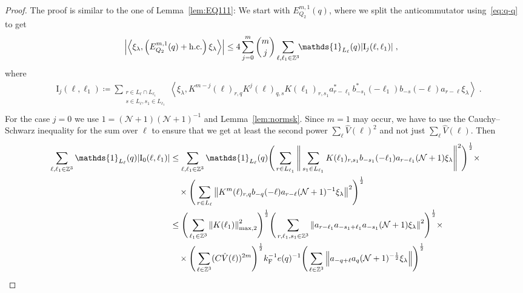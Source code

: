 \documentclass[12pt,a4paper]{article}
\numberwithin{equation}{section}
\newcommand{\1}{\mathbb{I}}
\newcommand{\F}{\mathrm{F}}
\newcommand{\I}{\mathrm{I}}
\newcommand{\kF}{k_\F}
\newcommand{\Zstar}{\mathbb{Z}^3} %
\newcommand{\Z}{\mathbb{Z}}
\newcommand{\NN}{\mathcal{N}}
\newcommand{\half}{\frac{1}{2}}
\newcommand{\eva}[1]{\left\langle #1 \right\rangle}
\theoremstyle{plain}
\theoremstyle{definition}
\theoremstyle{remark}
\theoremstyle{plain}
\theoremstyle{definition}
\theoremstyle{remark}
\begin{document}
\begin{proof}
The proof is similar to the one of Lemma~\ref{lem:EQ111}: We start with $ E^{m,1}_{Q_2}(q) $, where we split the anticommutator using~\eqref{eq:q-q} to get
\begin{equation} \label{eq:EQ2111}
\begin{aligned}
	& \abs{\eva{\xi_\lambda,\left(E^{m,1}_{Q_2}(q) + \mathrm{h.c.}\right) \xi_\lambda }}
	\le 4 \sum_{j=0}^m {{m}\choose j} \sum_{\ell,\ell_1 \in \Zstar}\!\! \mathds{1}_{L_\ell}(q) |\I_j(\ell, \ell_1)| \;,
	\end{aligned}
\end{equation}
where
\begin{equation}
\begin{aligned}
	& \I_j(\ell, \ell_1)
	\coloneq \sum_{\substack{r\in L_{\ell} \cap L_{\ell_1}\\ s \in L_{\ell},s_1\in L_{\ell_1}}}
		\eva{\xi_\lambda, K^{m-j}(\ell)_{r,q} K^{j}(\ell)_{q,s} K(\ell_1)_{r,s_1} a^*_{r-\ell_1} b^*_{-s_1}(-\ell_1) b_{-s}(-\ell) a_{r-\ell} \xi_\lambda} \;. \\
\end{aligned}
\end{equation}
For the case $ j = 0 $ we use $1 = (\NN+1) (\NN+1)^{-1}$ and Lemma~\ref{lem:normsk}. Since $ m = 1 $ may occur, we have to use the Cauchy--Schwarz inequality for the sum over $\ell$ to ensure that we get at least the second power $\sum_{\ell} \hat{V}(\ell)^2$ and not just $\sum_{\ell} \hat{V}(\ell)$. Then
\begin{align}
	\sum_{\ell,\ell_1 \in \Zstar} \mathds{1}_{L_\ell}(q) |\I_0(\ell, \ell_1)|
 	&\leq \sum\limits_{\ell,\ell_1 \in \Zstar} \mathds{1}_{L_\ell}(q) \Bigg( \sum\limits_{r \in L_{\ell_1}} 
 		\Bigg\Vert \sum\limits_{s_1 \in L_{\ell_1}} K(\ell_1)_{r,s_1} b_{-s_1}(-\ell_1) a_{r-\ell_1} (\NN+1) \xi_\lambda \Bigg\Vert^2\Bigg)^\half \times\nonumber\\
 	&\quad \times \Bigg( \sum\limits_{r \in L_\ell} \norm{K^{m}(\ell)_{r,q} b_{-q}(-\ell) a_{r-\ell} (\NN+1)^{-1}\xi_\lambda }^2\Bigg)^\half \nonumber\\
 	&\leq \Bigg( \sum\limits_{\ell_1 \in \Zstar} \norm{K(\ell_1)}_{\mathrm{max,2}}^2 \Bigg)^{\half} \Bigg(
 		\sum\limits_{r, \ell_1, s_1 \in \Z^3} \norm{a_{r-\ell_1} a_{-s_1+\ell_1} a_{-s_1} (\NN+1) \xi_\lambda}^2\Bigg)^\half \times\nonumber\\
 	&\quad \times \Bigg( \sum\limits_{\ell \in \Zstar}(C \hat{V}(\ell))^{2m} \Bigg)^{\half}
 		\kF^{-1} e(q)^{-1}
 		\Bigg( \sum\limits_{\ell \in \Z^3} \norm{a_{-q + \ell} a_q (\NN+1)^{-\half} \xi_\lambda } \Bigg)^{\half} \nonumber\\

\end{align}
\end{proof}
\end{document}
